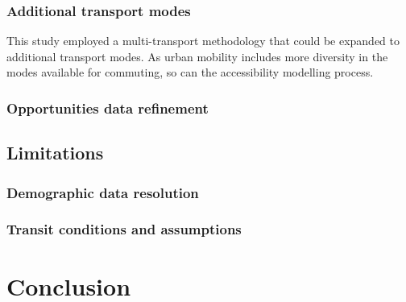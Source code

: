 \documentclass[12pt, a4paper]{report}
\begin{document}
\subsection{Additional transport modes}

This study employed a multi-transport methodology that could be expanded to additional transport modes. As urban mobility includes more diversity in the modes available for commuting, so can the accessibility modelling process. 

\subsection{Opportunities data refinement}

\section{Limitations}

\subsection{Demographic data resolution}

\subsection{Transit conditions and assumptions}

\chapter{Conclusion} \label{Chap7}
\end{document}
